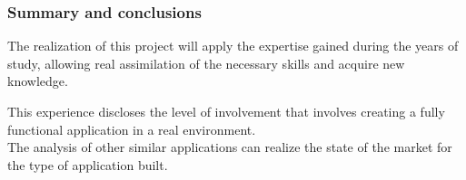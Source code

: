 \begin{frame} [fragile]
	\frametitle{Summary and conclusions}
		The realization of this project will apply the expertise gained during the years of study, allowing real assimilation of the necessary skills and acquire new knowledge.
		
		\bigskip
		This experience discloses the level of involvement that involves creating a fully functional application in a real environment.\\
		The analysis of other similar applications can realize the state of the market for the type of application built.
	\endblock{}
\end{frame}
